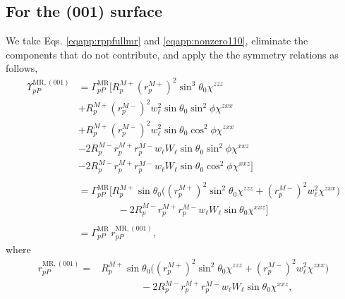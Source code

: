 \subsection{For the (001) surface}

We take Eqs. \eqref{eqapp:rppfullmr} and \eqref{eqapp:nonzero110}, eliminate the
components that do not contribute, and apply the the symmetry relations as
follows,
\begin{equation*}
\begin{split}
\Upsilon^{\mathrm{MR},(001)}_{pP} &=
\Gamma^{\mathrm{MR}}_{pP}
\big[
R^{M+}_{p}\left(r^{M+}_{p}\right)^{2}\sin^{3}\theta_{0}\chi^{zzz}\\
&+R^{M+}_{p}\left(r^{M-}_{p}\right)^{2}w^{2}_{\ell}
            \sin\theta_{0}\sin^{2}\phi\chi^{zxx}\\
&+R^{M+}_{p}\left(r^{M-}_{p}\right)^{2}w^{2}_{\ell}
            \sin\theta_{0}\cos^{2}\phi\chi^{zxx}\\
&-2R^{M-}_{p}r^{M+}_{p}r^{M-}_{p}w_{\ell}W_{\ell}
            \sin\theta_{0}\sin^{2}\phi\chi^{xxz}\\
&-2R^{M-}_{p}r^{M+}_{p}r^{M-}_{p}w_{\ell}W_{\ell}
            \sin\theta_{0}\cos^{2}\phi\chi^{xxz}
\big]\\\\
&=
\Gamma^{\mathrm{MR}}_{pP}
\big[
R^{M+}_{p}\sin\theta_{0}
\bigg(
\left(r^{M+}_{p}\right)^{2}\sin^{2}\theta_{0}\chi^{zzz}
+ \left(r^{M-}_{p}\right)^{2}w^{2}_{\ell}\chi^{zxx}
\bigg)\\
&\qquad\qquad- 2R^{M-}_{p}r^{M+}_{p}r^{M-}_{p}w_{\ell}W_{\ell}\sin\theta_{0}
\chi^{xxz}
\big]\\\\
&= \Gamma^{\mathrm{MR}}_{pP}\,r^{\mathrm{MR},(001)}_{pP},
\end{split}
\end{equation*}
where
\begin{equation}\label{eqapp:final-rpp.mr.001}
\begin{split}
r^{\mathrm{MR},(001)}_{pP} = 
&R^{M+}_{p}\sin\theta_{0}
\bigg(
\left(r^{M+}_{p}\right)^{2}\sin^{2}\theta_{0}\chi^{zzz}
+ \left(r^{M-}_{p}\right)^{2}w^{2}_{\ell}\chi^{zxx}
\bigg)\\
&\qquad\qquad- 2R^{M-}_{p}r^{M+}_{p}r^{M-}_{p}w_{\ell}W_{\ell}\sin\theta_{0}
\chi^{xxz},
\end{split}
\end{equation}

